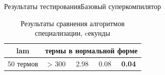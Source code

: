 \documentclass[xcolor=table]{beamer}
\begin{document}
\begin{frame}{Результаты тестирования}{\small Базовый суперкомпилятор}
\begin{table}
\begin{tabular}{|c|c|c|c|c|}
\rowcolor{black!10}
{\bf lam} & \multicolumn{4}{|l|}{термы в нормальной форме} \\ \hline
50 термов & > 300    & 2.98  & 0.08 & {\bf 0.04}   \\
\hline
\end{tabular}
\caption{Результаты сравнения алгоритмов специализации, cекунды}
\label{fig:totalResult}
\end{table}
%
%
%
%

\end{frame}
\end{document}

